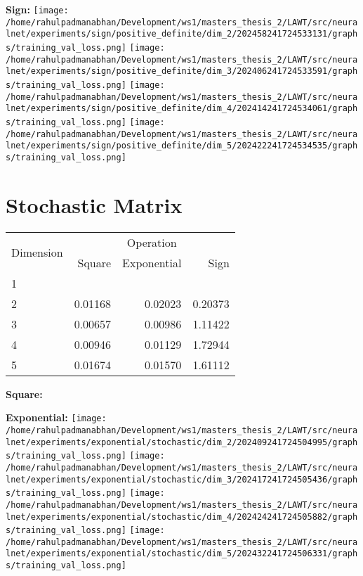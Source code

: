 \documentclass{article}
\begin{document}
\textbf{Sign:}
\texttt{[image: /home/rahulpadmanabhan/Development/ws1/masters\_thesis\_2/LAWT/src/neuralnet/experiments/sign/positive\_definite/dim\_2/202458241724533131/graphs/training\_val\_loss.png]}
\texttt{[image: /home/rahulpadmanabhan/Development/ws1/masters\_thesis\_2/LAWT/src/neuralnet/experiments/sign/positive\_definite/dim\_3/202406241724533591/graphs/training\_val\_loss.png]}
\texttt{[image: /home/rahulpadmanabhan/Development/ws1/masters\_thesis\_2/LAWT/src/neuralnet/experiments/sign/positive\_definite/dim\_4/202414241724534061/graphs/training\_val\_loss.png]}
\texttt{[image: /home/rahulpadmanabhan/Development/ws1/masters\_thesis\_2/LAWT/src/neuralnet/experiments/sign/positive\_definite/dim\_5/202422241724534535/graphs/training\_val\_loss.png]}

\pagebreak
\section{Stochastic Matrix}
\begin{tabular}{@{}lrrr@{}}
\toprule
\multirow{2}{*}{Dimension} & \multicolumn{3}{c}{Operation} \\
\cmidrule(l){2-4}
& Square & Exponential & Sign \\
\midrule
1 & & & \\
2 & 0.01168 & 0.02023 & 0.20373 \\
3 & 0.00657 & 0.00986 & 1.11422 \\
4 & 0.00946 & 0.01129 & 1.72944 \\
5 & 0.01674 & 0.01570 & 1.61112 \\
\bottomrule
\end{tabular}

\textbf{Square:}

\textbf{Exponential:}
\texttt{[image: /home/rahulpadmanabhan/Development/ws1/masters\_thesis\_2/LAWT/src/neuralnet/experiments/exponential/stochastic/dim\_2/202409241724504995/graphs/training\_val\_loss.png]}
\texttt{[image: /home/rahulpadmanabhan/Development/ws1/masters\_thesis\_2/LAWT/src/neuralnet/experiments/exponential/stochastic/dim\_3/202417241724505436/graphs/training\_val\_loss.png]}
\texttt{[image: /home/rahulpadmanabhan/Development/ws1/masters\_thesis\_2/LAWT/src/neuralnet/experiments/exponential/stochastic/dim\_4/202424241724505882/graphs/training\_val\_loss.png]}
\texttt{[image: /home/rahulpadmanabhan/Development/ws1/masters\_thesis\_2/LAWT/src/neuralnet/experiments/exponential/stochastic/dim\_5/202432241724506331/graphs/training\_val\_loss.png]}
\end{document}
